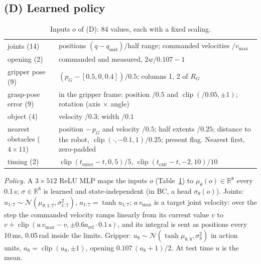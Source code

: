 \documentclass[conference]{IEEEtran}
\begin{document}
\subsection{(D) Learned policy}
\label{app:D}

\begin{table}[!t]
  \centering
  \caption{Inputs $o$ of (D): 84 values, each with a fixed scaling.}
  \label{tab:obsD}
  \footnotesize\setlength{\tabcolsep}{3pt}
  \begin{tabular}{@{}>{\raggedright\arraybackslash}p{}>{\raggedright\arraybackslash}p{}@{}}
    \toprule
    joints (14) & positions $(q-q_{\text{mid}})/$half range; commanded velocities $/v_{\max}$ \\
    opening (2) & commanded and measured, $2w/0.107-1$ \\
    gripper pose (9) & $(p_G-[0.5,0,0.4])/0.5$; columns 1, 2 of $R_G$ \\
    grasp-pose error (9) & in the gripper frame: position $/0.5$ and $\operatorname{clip}(/0.05,\pm1)$; rotation
      (axis $\times$ angle) \\
    object (4) & velocity $/0.3$; width $/0.1$ \\
    4 nearest obstacles ($4\times11$) & position $-\,p_G$ and velocity $/0.5$; half extents $/0.25$; distance to the
      robot, $\operatorname{clip}(\cdot,-0.1,1)/0.25$; present flag. Nearest first, zero-padded \\
    timing (2) & $\operatorname{clip}(t_{\text{enter}}-t,0,5)/5$, $\operatorname{clip}(t_{\text{exit}}-t,-2,10)/10$ \\
    \bottomrule
  \end{tabular}
\end{table}

\emph{Policy.} A $3\times512$ ReLU MLP maps the inputs $o$ (Table~\ref{tab:obsD}) to $\mu_\theta(o)\in\mathbb R^8$
every 0.1\,s; $\sigma\in\mathbb R^8$ is learned and state-independent (in BC, a head $\sigma_\theta(o)$). Joints:
$u_{1:7}\sim\mathcal N(\mu_{\theta,1:7},\sigma_{1:7}^2)$, $a_{1:7}=\tanh u_{1:7}$; $a\,v_{\max}$ is a target joint
velocity: over the step the commanded velocity ramps linearly from its current value $v$ to
$v+\operatorname{clip}(a\,v_{\max}-v,\pm0.6a_{\text{ref}}\cdot0.1\,\text{s})$, and its integral is sent as positions
every 10\,ms, 0.05\,rad inside the limits. Gripper: $u_8\sim\mathcal N(\tanh\mu_{\theta,8},\sigma_8^2)$ in action
units, $a_8=\operatorname{clip}(u_8,\pm1)$, opening $0.107\,(a_8+1)/2$. At test time $u$ is the mean.
\end{document}
